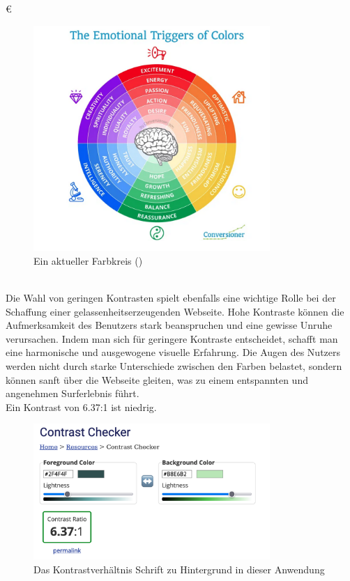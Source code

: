 €\documentclass[./dokumentation.tex]{subfiles}
\begin{document}
\begin{figure}[H]
\centering
\includegraphics[width=0.8\textwidth]{bilder/farbkreis.png}
\caption{Ein aktueller Farbkreis (\cite{DesignEmo2003})}
\label{fig20:farbkreis}
\end{figure}\\

Die Wahl von geringen Kontrasten spielt ebenfalls eine wichtige Rolle bei der Schaffung einer gelassenheitserzeugenden Webseite. Hohe Kontraste können die Aufmerksamkeit des Benutzers stark beanspruchen und eine gewisse Unruhe verursachen. Indem man sich für geringere Kontraste entscheidet, schafft man eine harmonische und ausgewogene visuelle Erfahrung. Die Augen des Nutzers werden nicht durch starke Unterschiede zwischen den Farben belastet, sondern können sanft über die Webseite gleiten, was zu einem entspannten und angenehmen Surferlebnis führt.\\
Ein Kontrast von 6.37:1 ist niedrig. \\

\begin{figure}[H]
    \centering
    \includegraphics[width=0.8\textwidth]{bilder/contrast-gelassenheit.png}
    \caption{Das Kontrastverhältnis Schrift zu Hintergrund in dieser Anwendung}
    \label{fig21:contrast}
\end{figure}\\
\end{document}
